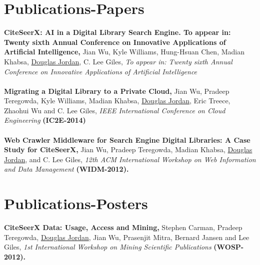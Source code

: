 \documentclass[margin]{res}
\begin{document}
\begin{resume}
\section{Publications-Papers}
{\bf CiteSeerX: AI in a Digital Library Search Engine. To appear in: Twenty sixth Annual Conference on Innovative Applications of Artificial Intelligence,}  Jian Wu, Kyle Williams, Hung-Hsuan Chen, Madian Khabsa, \underline{Douglas Jordan}, C. Lee Giles, \textit{To appear in: Twenty sixth Annual Conference on Innovative Applications of Artificial Intelligence} \\ \\
{\bf Migrating a Digital Library to a Private Cloud,} Jian Wu, Pradeep Teregowda, Kyle Williams, Madian Khabsa, \underline{Douglas Jordan}, Eric Treece, Zhaohui Wu and C. Lee Giles, \emph{IEEE International Conference on Cloud Engineering} {\bf (IC2E-2014)} \\ \\
{\bf Web Crawler Middleware for Search Engine Digital Libraries: A Case Study for CiteSeerX,} Jian Wu, Pradeep Teregowda, Madian Khabsa, \underline{Douglas Jordan}, and C. Lee Giles, \emph{12th ACM International Workshop on Web Information and Data Management} {\bf (WIDM-2012).} 


\section{Publications-Posters}
{\bf CiteSeerX Data: Usage, Access and Mining,} Stephen Carman, Pradeep Teregowda, \underline{Douglas Jordan}, Jian Wu, Prasenjit Mitra, Bernard Jansen and Lee Giles, \emph{1st International Workshop on Mining Scientific Publications} {\bf (WOSP-2012).}


\end{resume}
\end{document}
